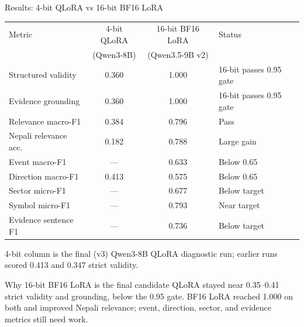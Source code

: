 \documentclass[aspectratio=169,11pt]{beamer}
\begin{document}
\begin{frame}{Results: 4-bit QLoRA vs 16-bit BF16 LoRA}
  \scriptsize
  \renewcommand{\arraystretch}{0.92}
  \begin{tabularx}{\textwidth}{@{}lccY@{}}
    \toprule
    Metric & 4-bit QLoRA & 16-bit BF16 LoRA & Status \\
     & (Qwen3-8B) & (Qwen3.5-9B v2) & \\
    \midrule
    Structured validity & 0.360 & 1.000 & 16-bit passes 0.95 gate \\
    Evidence grounding & 0.360 & 1.000 & 16-bit passes 0.95 gate \\
    Relevance macro-F1 & 0.384 & 0.796 & Pass \\
    Nepali relevance acc. & 0.182 & 0.788 & Large gain \\
    Event macro-F1 & --- & 0.633 & Below 0.65 \\
    Direction macro-F1 & 0.413 & 0.575 & Below 0.65 \\
    Sector micro-F1 & --- & 0.677 & Below target \\
    Symbol micro-F1 & --- & 0.793 & Near target \\
    Evidence sentence F1 & --- & 0.736 & Below target \\
    \bottomrule
  \end{tabularx}

  \vspace{0.08cm}
  {\tiny 4-bit column is the final (v3) Qwen3-8B QLoRA diagnostic run; earlier runs scored 0.413 and 0.347 strict validity.}

  \vspace{0.04cm}
  \begin{alertblock}{Why 16-bit BF16 LoRA is the final candidate}
    QLoRA stayed near 0.35--0.41 strict validity and grounding, below the 0.95 gate. BF16 LoRA reached 1.000 on both and improved Nepali relevance; event, direction, sector, and evidence metrics still need work.
  \end{alertblock}
\end{frame}
\end{document}
